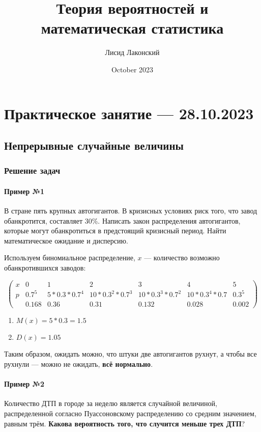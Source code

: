 \documentclass{article}
\title{Теория вероятностей и математическая статистика}
\author{Лисид Лаконский}
\date{October 2023}
\begin{document}
\raggedright

\maketitle

\tableofcontents
\pagebreak

\section{Практическое занятие — 28.10.2023}

\subsection{Непрерывные случайные величины}

\subsubsection{Решение задач}

\paragraph{Пример №1} В стране пять крупных автогигантов. В кризисных условиях риск того, что завод обанкротится, составляет 30\%. Написать закон распределения автогигантов, которые могут обанкротиться в предстоящий кризисный период. Найти математическое ожидание и дисперсию.

Используем биномиальное распределение, $x$ — количество возможно обанкротившихся заводов:

$$
\begin{pmatrix}
  x & 0 & 1 & 2 & 3 & 4 & 5 \\
  p & 0.7^5 & 5*0.3*0.7^4 & 10*0.3^2*0.7^3 & 10*0.3^3*0.7^2 & 10*0.3^4*0.7 & 0.3^5  \\
    & 0.168 & 0.36 & 0.31 & 0.132 & 0.028 & 0.002
\end{pmatrix}
$$

\begin{enumerate}
    \item $M(x) = 5 * 0.3 = 1.5$
    \item $D(x) = 1.05$
\end{enumerate}

Таким образом, ожидать можно, что штуки две автогигантов рухнут, а чтобы все рухнули — можно не ожидать, \textbf{всё нормально}.

\paragraph{Пример №2} Количество ДТП в городе за неделю является случайной величиной, распределенной согласно Пуассоновскому распределению со средним значением, равным трём. \textbf{Какова вероятность того, что случится меньше трех ДТП}?
\end{document}
